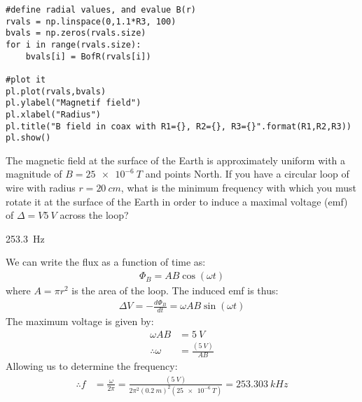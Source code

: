 \begin{solution}
\begin{parts}
\begin{verbatim}
#define radial values, and evalue B(r)
rvals = np.linspace(0,1.1*R3, 100)
bvals = np.zeros(rvals.size)
for i in range(rvals.size):
    bvals[i] = BofR(rvals[i])

#plot it
pl.plot(rvals,bvals)
pl.ylabel("Magnetif field")
pl.xlabel("Radius")
pl.title("B field in coax with R1={}, R2={}, R3={}".format(R1,R2,R3))
pl.show()
\end{verbatim}
\end{parts}
\end{solution}

\question The magnetic field at the surface of the Earth is approximately uniform with a magnitude of $B=\SI{25e-6}{T}$ and points North. If you have a circular loop of wire with radius $r=\SI{20}{cm}$, what is the minimum frequency with which you must rotate it at the surface of the Earth in order to induce a maximal voltage (emf) of $\Delta= V\SI{5}{V}$ across the loop?
\begin{finalanswer}
	\SI{253.3}{Hz}
\end{finalanswer}
\begin{solution}
	We can write the flux as a function of time as:
	\begin{align*}
	\Phi_B = AB\cos(\omega t)
	\end{align*}
	where $A=\pi r^2$ is the area of the loop. The induced emf is thus:
	\begin{align*}
	\Delta V = -\frac{d\Phi_B}{dt}=\omega AB \sin(\omega t)
	\end{align*}
	The maximum voltage is given by:
	\begin{align*}
	\omega A B &= \SI{5}{V}\\
	\therefore \omega &= \frac{(\SI{5}{V})}{AB}
	\end{align*}
	Allowing us to determine the frequency:
	\begin{align*}
	\therefore f &= \frac{\omega}{2\pi}=\frac{(\SI{5}{V})}{2\pi^2(\SI{0.2}{m})^2(\SI{25e-6}{T})}=\SI{253.303}{kHz}
	\end{align*}
\end{solution}

